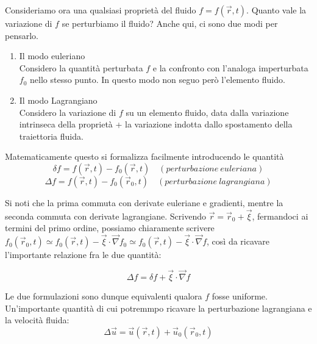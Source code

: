 \documentclass{report}
\begin{document}
Consideriamo ora una qualsiasi proprietà del fluido $f= f(\vec{r}, t)$. Quanto vale la variazione di $f$ se perturbiamo il fluido? Anche qui, ci sono due modi per pensarlo. 
\begin{enumerate}
    \item Il modo euleriano\\
    Considero la quantità perturbata $f$ e la confronto con l'analoga imperturbata $f_0$ nello stesso punto. In questo modo non seguo però l'elemento fluido. 
    \item Il modo Lagrangiano\\
    Considero la variazione di $f$ su un elemento fluido, data dalla variazione intrinseca della proprietà + la variazione indotta dallo spostamento della traiettoria fluida. 
\end{enumerate}

Matematicamente questo si formalizza facilmente introducendo le quantità 
\begin{equation}
    \delta f = f(\vec{r}, t) - f_0(\vec{r}, t) \quad (perturbazione \ euleriana)
\end{equation}
\begin{equation}
    \Delta f = f(\vec{r}, t) - f_0(\vec{r}_0, t) \quad (perturbazione \ lagrangiana)
\end{equation}

Si noti che la prima commuta con derivate euleriane e gradienti, mentre la seconda commuta con derivate lagrangiane. Scrivendo $\vec{r} = \vec{r}_0 + \vec{\xi}$, fermandoci ai termini del primo ordine, possiamo chiaramente scrivere $f_0(\vec{r}_0, t ) \simeq f_0(\vec{r}, t ) - \vec{\xi}\cdot \vec{\nabla}f_0 \simeq f_0(\vec{r}, t ) - \vec{\xi}\cdot \vec{\nabla}f$, così da ricavare l'importante relazione fra le due quantità:

 \begin{tcolorbox}[colback=myg!15, colframe=black, boxrule=1pt]
\begin{equation}
    \Delta f = \delta f + \vec{\xi}\cdot\vec{\nabla}f
\end{equation}
\end{tcolorbox}

Le due formulazioni sono dunque equivalenti qualora $f$ fosse uniforme. \\
Un'importante quantità di cui potremmpo ricavare la perturbazione lagrangiana e la velocità fluida: 
\begin{equation}
    \Delta \vec{u} = \vec{u}(\vec{r}, t) + \vec{u}_0(\vec{r}_0, t)
\end{equation}
\end{document}
